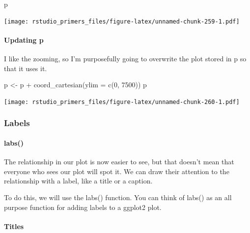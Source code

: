 \documentclass[
]{article}
\newenvironment{Shaded}{\begin{snugshade}}{\end{snugshade}}
\newcommand{\AttributeTok}[1]{\textcolor[rgb]{0.77,0.63,0.00}{#1}}
\newcommand{\DecValTok}[1]{\textcolor[rgb]{0.00,0.00,0.81}{#1}}
\newcommand{\FunctionTok}[1]{\textcolor[rgb]{0.00,0.00,0.00}{#1}}
\newcommand{\NormalTok}[1]{#1}
\newcommand{\OtherTok}[1]{\textcolor[rgb]{0.56,0.35,0.01}{#1}}
\newcommand{\SpecialCharTok}[1]{\textcolor[rgb]{0.00,0.00,0.00}{#1}}
\begin{document}
\begin{Shaded}
\begin{Highlighting}[]
\NormalTok{p}
\end{Highlighting}
\end{Shaded}

\texttt{[image: rstudio\_primers\_files/figure-latex/unnamed-chunk-259-1.pdf]}

\hypertarget{updating-p}{%
\paragraph{Updating p}\label{updating-p}}

I like the zooming, so I'm purposefully going to overwrite the plot
stored in p so that it uses it.

\begin{Shaded}
\begin{Highlighting}[]
\NormalTok{p }\OtherTok{\textless{}{-}}\NormalTok{ p }\SpecialCharTok{+} \FunctionTok{coord\_cartesian}\NormalTok{(}\AttributeTok{ylim =} \FunctionTok{c}\NormalTok{(}\DecValTok{0}\NormalTok{, }\DecValTok{7500}\NormalTok{))}
\NormalTok{p}
\end{Highlighting}
\end{Shaded}

\texttt{[image: rstudio\_primers\_files/figure-latex/unnamed-chunk-260-1.pdf]}

\hypertarget{labels}{%
\subsubsection{Labels}\label{labels}}

\hypertarget{labs}{%
\paragraph{labs()}\label{labs}}

The relationship in our plot is now easier to see, but that doesn't mean
that everyone who sees our plot will spot it. We can draw their
attention to the relationship with a label, like a title or a caption.

To do this, we will use the labs() function. You can think of labs() as
an all purpose function for adding labels to a ggplot2 plot.

\hypertarget{titles}{%
\paragraph{Titles}\label{titles}}
\end{document}
